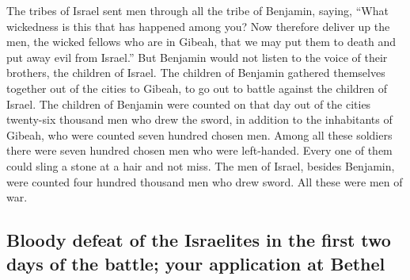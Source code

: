  The tribes of Israel sent men through all the tribe of
Benjamin, saying, ``What wickedness is this that has happened among you?
 Now therefore deliver up the men, the wicked fellows who
are in Gibeah, that we may put them to death and put away evil from
Israel.'' But Benjamin would not listen to the voice of their brothers,
the children of Israel.  The children of Benjamin
gathered themselves together out of the cities to Gibeah, to go out to
battle against the children of Israel.  The children of
Benjamin were counted on that day out of the cities twenty-six thousand
men who drew the sword, in addition to the inhabitants of Gibeah, who
were counted seven hundred chosen men.  Among all these
soldiers there were seven hundred chosen men who were left-handed. Every
one of them could sling a stone at a hair and not miss. 
The men of Israel, besides Benjamin, were counted four hundred thousand
men who drew sword. All these were men of war.

\hypertarget{bloody-defeat-of-the-israelites-in-the-first-two-days-of-the-battle-your-application-at-bethel}{%
\subsection{Bloody defeat of the Israelites in the first two days of the
battle; your application at
Bethel}\label{bloody-defeat-of-the-israelites-in-the-first-two-days-of-the-battle-your-application-at-bethel}}

